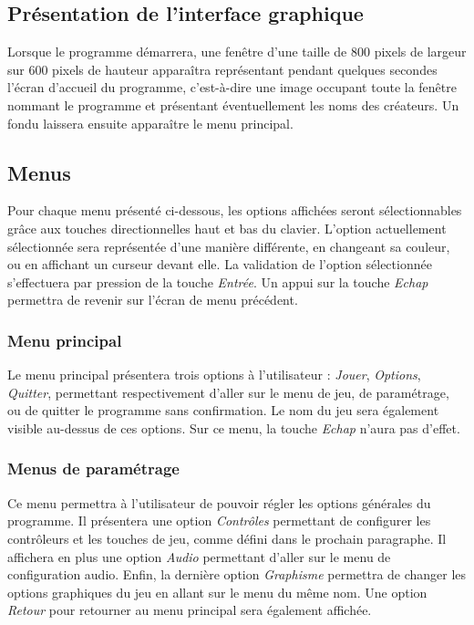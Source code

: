 \subsection{Présentation de l'interface graphique}

Lorsque le programme démarrera, une fenêtre d'une taille de 800 pixels de largeur sur 600 pixels de hauteur apparaîtra représentant pendant quelques secondes l'écran d'accueil du programme, c'est-à-dire une image occupant toute la fenêtre nommant le programme et présentant éventuellement les noms des créateurs. Un fondu laissera ensuite apparaître le menu principal.

\subsection{Menus}

Pour chaque menu présenté ci-dessous, les options affichées seront sélectionnables grâce aux touches directionnelles haut et bas du clavier. L'option  actuellement sélectionnée sera représentée d'une manière différente, en changeant sa couleur, ou en affichant un curseur devant elle. La validation de l'option sélectionnée s'effectuera par pression de la touche \emph{Entrée}. Un appui sur la touche \emph{Echap} permettra de revenir sur l'écran de menu précédent.

\subsubsection{Menu principal}

Le menu principal présentera trois options à l'utilisateur : \emph{Jouer}, \emph{Options}, \emph{Quitter}, permettant respectivement d'aller sur le menu de jeu, de paramétrage, ou de quitter le programme sans confirmation. Le nom du jeu sera également visible au-dessus de ces options. Sur ce menu, la touche \emph{Echap} n'aura pas d'effet.

\subsubsection{Menus de paramétrage}

Ce menu permettra à l'utilisateur de pouvoir régler les options générales du programme. Il présentera une option \emph{Contrôles} permettant de configurer les contrôleurs et les touches de jeu, comme défini dans le prochain paragraphe. Il affichera en plus une option \emph{Audio} permettant d'aller sur le menu de configuration audio. Enfin, la dernière option \emph{Graphisme} permettra de changer les options graphiques du jeu en allant sur le menu du même nom. Une option \emph{Retour} pour retourner au menu principal sera également affichée.

